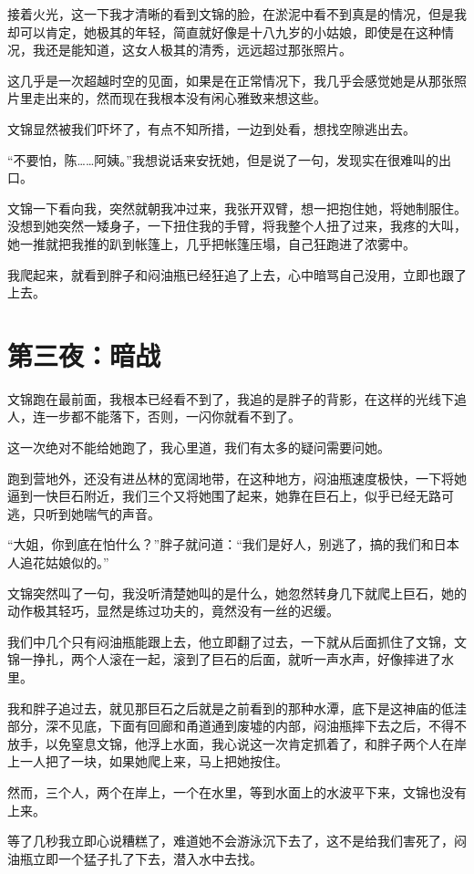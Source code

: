 接着火光，这一下我才清晰的看到文锦的脸，在淤泥中看不到真是的情况，但是我却可以肯定，她极其的年轻，简直就好像是十八九岁的小姑娘，即使是在这种情况，我还是能知道，这女人极其的清秀，远远超过那张照片。

这几乎是一次超越时空的见面，如果是在正常情况下，我几乎会感觉她是从那张照片里走出来的，然而现在我根本没有闲心雅致来想这些。

文锦显然被我们吓坏了，有点不知所措，一边到处看，想找空隙逃出去。

“不要怕，陈……阿姨。”我想说话来安抚她，但是说了一句，发现实在很难叫的出口。

文锦一下看向我，突然就朝我冲过来，我张开双臂，想一把抱住她，将她制服住。没想到她突然一矮身子，一下扭住我的手臂，将我整个人扭了过来，我疼的大叫，她一推就把我推的趴到帐篷上，几乎把帐篷压塌，自己狂跑进了浓雾中。

我爬起来，就看到胖子和闷油瓶已经狂追了上去，心中暗骂自己没用，立即也跟了上去。

\chapter{第三夜：暗战}

文锦跑在最前面，我根本已经看不到了，我追的是胖子的背影，在这样的光线下追人，连一步都不能落下，否则，一闪你就看不到了。

这一次绝对不能给她跑了，我心里道，我们有太多的疑问需要问她。

跑到营地外，还没有进丛林的宽阔地带，在这种地方，闷油瓶速度极快，一下将她逼到一快巨石附近，我们三个又将她围了起来，她靠在巨石上，似乎已经无路可逃，只听到她喘气的声音。

“大姐，你到底在怕什么？”胖子就问道：“我们是好人，别逃了，搞的我们和日本人追花姑娘似的。”

文锦突然叫了一句，我没听清楚她叫的是什么，她忽然转身几下就爬上巨石，她的动作极其轻巧，显然是练过功夫的，竟然没有一丝的迟缓。

我们中几个只有闷油瓶能跟上去，他立即翻了过去，一下就从后面抓住了文锦，文锦一挣扎，两个人滚在一起，滚到了巨石的后面，就听一声水声，好像摔进了水里。

我和胖子追过去，就见那巨石之后就是之前看到的那种水潭，底下是这神庙的低洼部分，深不见底，下面有回廊和甬道通到废墟的内部，闷油瓶摔下去之后，不得不放手，以免窒息文锦，他浮上水面，我心说这一次肯定抓着了，和胖子两个人在岸上一人把了一块，如果她爬上来，马上把她按住。

然而，三个人，两个在岸上，一个在水里，等到水面上的水波平下来，文锦也没有上来。

等了几秒我立即心说糟糕了，难道她不会游泳沉下去了，这不是给我们害死了，闷油瓶立即一个猛子扎了下去，潜入水中去找。


